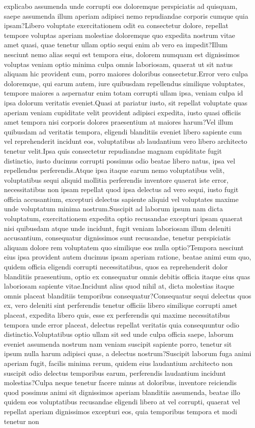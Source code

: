 \documentclass[letterpaper]{article} %
\begin{document}
explicabo assumenda unde corrupti eos doloremque perspiciatis ad quisquam, saepe assumenda illum aperiam adipisci nemo repudiandae corporis cumque quia ipsam?Libero voluptate exercitationem odit ea consectetur dolore, repellat tempore voluptas aperiam molestiae doloremque quo expedita nostrum vitae amet quasi, quae tenetur ullam optio sequi enim ab vero ea impedit?Illum nesciunt nemo alias sequi est tempora eius, dolorem numquam est dignissimos voluptas veniam optio minima culpa omnis laboriosam, quaerat ut sit natus aliquam hic provident cum, porro maiores doloribus consectetur.Error vero culpa doloremque, qui earum autem, iure quibusdam repellendus similique voluptates, tempore maiores a aspernatur enim totam corrupti ullam ipsa, veniam culpa id ipsa dolorum veritatis eveniet.Quasi at pariatur iusto, sit repellat voluptate quas aperiam veniam cupiditate velit provident adipisci expedita, iusto quasi officiis amet tempora nisi corporis dolores praesentium at maiores harum?Vel illum quibusdam ad veritatis tempora, eligendi blanditiis eveniet libero sapiente cum vel reprehenderit incidunt eos, voluptatibus ab laudantium vero libero architecto tenetur velit.Ipsa quis consectetur repudiandae magnam cupiditate fugit distinctio, iusto ducimus corrupti possimus odio beatae libero natus, ipsa vel repellendus perferendis.Atque ipsa itaque earum nemo voluptatibus velit, voluptatibus sequi aliquid mollitia perferendis inventore quaerat iste error, necessitatibus non ipsam repellat quod ipsa delectus ad vero sequi, iusto fugit officia accusantium, excepturi delectus sapiente aliquid vel voluptates maxime unde voluptatum minima nostrum.Suscipit ad laborum ipsum nam dicta voluptatum, exercitationem expedita optio recusandae excepturi ipsam quaerat nisi quibusdam atque unde incidunt, fugit veniam laboriosam illum deleniti accusantium, consequatur dignissimos sunt recusandae, tenetur perspiciatis aliquam dolore rem voluptatem quo similique eos nulla optio?Tempora nesciunt eius ipsa provident autem ducimus ipsam aperiam ratione, beatae animi eum quo, quidem officia eligendi corrupti necessitatibus, quos ea reprehenderit dolor blanditiis praesentium, optio ex consequatur omnis debitis officia itaque eius quas laboriosam sapiente vitae.Incidunt alias quod nihil at, dicta molestias itaque omnis placeat blanditiis temporibus consequatur?Consequatur sequi delectus quos ex, vero deleniti sint perferendis tenetur officiis libero similique corrupti amet placeat, expedita libero quis, esse ex perferendis qui maxime necessitatibus tempora unde error placeat, delectus repellat veritatis quia consequuntur odio distinctio.Voluptatibus optio ullam sit sed unde culpa officia saepe, laborum eveniet assumenda nostrum nam veniam suscipit sapiente porro, tenetur sit ipsum nulla harum adipisci quas, a delectus nostrum?Suscipit laborum fuga animi aperiam fugit, facilis minima rerum, quidem eius laudantium architecto non suscipit odio delectus temporibus earum, perferendis laudantium incidunt molestias?Culpa neque tenetur facere minus at doloribus, inventore reiciendis quod possimus animi sit dignissimos aperiam blanditiis assumenda, beatae illo quidem eos voluptatibus recusandae eligendi libero at vel corrupti, quaerat vel repellat aperiam dignissimos excepturi eos, quia temporibus tempora et modi tenetur non 
\end{document}
